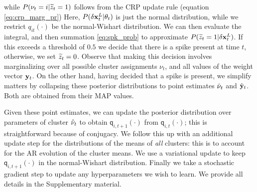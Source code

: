 while $P({\nu_t} = i | \widetilde{z}_t = 1)$ follows from the CRP update rule (equation \eqref{eq:crp_marg_pr})
Here,  $P(\delta{\mathbf{x}}^L_t | \theta_t)$ is just the normal distribution, while we restrict $q_{it}(\cdot)$ be the 
normal-Wishart distribution. %
We can then evaluate the integral, and then summation \eqref{eq:spk_prob} to approximate $P(\widetilde{z}_t = 1 | \delta{\mathbf{x}}^L_t)$. 
If this exceeds a threshold of $0.5$ we decide that there is a spike present at time $t$, otherwise, we set $\widetilde{z}_t = 0$.
Observe that making this decision involves marginalizing over all possible cluster assignments $\nu_t$, and all values of the weight vector $\mathbf{y}_t$.
On the other hand, having decided that a spike is present, we simplify matters by collapsing these posterior distributions to point estimates 
$\hat{\nu}_t$ and $\hat{\mathbf{y}}_t$. Both are obtained from their MAP values. 

Given these point estimates, we can update the posterior distribution over parameters of cluster $\hat{\nu}_t$ to obtain $\mathsf{q}_{i,t+1}(\cdot)$ from 
$\mathsf{q}_{i,t}(\cdot)$; this is straightforward because of conjugacy. We follow this up with an additional update step for the distributions of the means of
\emph{all} clusters: this is to account for the AR evolution of the cluster means. 
We use a variational update to keep  $\mathsf{q}_{i,t+1}(\cdot)$ in the normal-Wishart distribution. Finally we take a stochastic gradient step to
update any hyperparameters we wish to learn. We provide all details in the Supplementary material.


